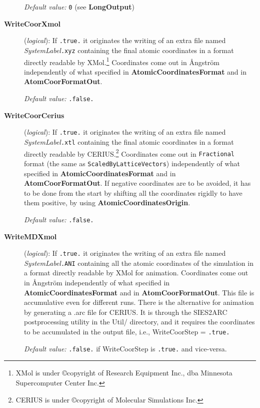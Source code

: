 \begin{description}
{\it Default value:} {\tt 0} (see {\bf LongOutput})


\item[{\bf WriteCoorXmol}] ({\it logical}): 
If {\tt .true.} it originates the writing of an extra file
named {\it SystemLabel}{\tt .xyz} containing the final atomic
coordinates in a format directly readable by {\sc XMol}.\footnote{XMol
is under \copyright copyright of Research Equipment Inc., dba Minnesota
Supercomputer Center Inc.} Coordinates come out in {\AA}ngstr\"om
independently of what specified in {\bf AtomicCoordinatesFormat} and
in {\bf AtomCoorFormatOut}.

{\it Default value:} {\tt .false.}
        

\item[{\bf WriteCoorCerius}] ({\it logical}): 
If {\tt .true.} it originates the writing of an extra file
named {\it SystemLabel}{\tt .xtl} containing the final atomic
coordinates in a format directly readable by CERIUS.\footnote{CERIUS
is under \copyright copyright of Molecular Simulations Inc.} 
Coordinates come out in 
{\tt Fractional} format (the same as {\tt ScaledByLatticeVectors})
independently of what specified in {\bf AtomicCoordinatesFormat} and
in {\bf AtomCoorFormatOut}.
If negative coordinates are to be avoided, it has to be 
done from the start by shifting all the coordinates rigidly
to have them positive, by using {\bf AtomicCoordinatesOrigin}.

{\it Default value:} {\tt .false.}

 
\item[{\bf WriteMDXmol}] ({\it logical}):
If {\tt .true.} it originates the writing of an extra file
named {\it SystemLabel}{\tt .ANI} containing all the atomic
coordinates of the simulation in a format directly readable by 
{\sc XMol} for animation. Coordinates come out in 
{\AA}ngstr\"om independently of what specified in 
{\bf AtomicCoordinatesFormat} and in {\bf AtomCoorFormatOut}.
This file is accumulative even for different runs.
There is the alternative for animation by generating a .arc file for 
CERIUS. It is through the SIES2ARC postprocessing utility 
in the Util/ directory, and it requires the coordinates to be
accumulated in the output file, i.e., WriteCoorStep = {\tt .true.}
 
{\it Default value:} {\tt .false.} if WriteCoorStep is {\tt .true.}
and vice-versa.


\end{description}
